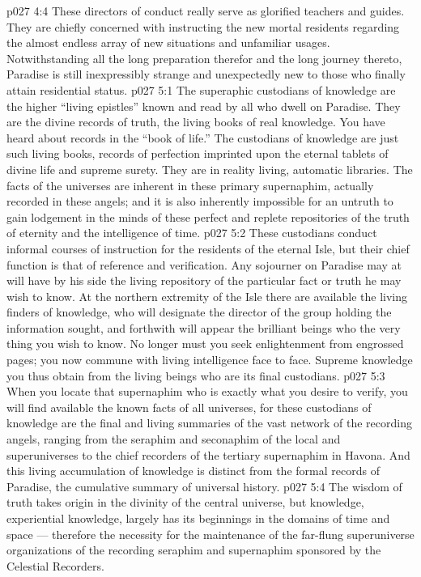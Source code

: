 \vs p027 4:4 These directors of conduct really serve as glorified teachers and guides. They are chiefly concerned with instructing the new mortal residents regarding the almost endless array of new situations and unfamiliar usages. Notwithstanding all the long preparation therefor and the long journey thereto, Paradise is still inexpressibly strange and unexpectedly new to those who finally attain residential status.
\vs p027 5:1 The superaphic custodians of knowledge are the higher “living epistles” known and read by all who dwell on Paradise. They are the divine records of truth, the living books of real knowledge. You have heard about records in the “book of life.” The custodians of knowledge are just such living books, records of perfection imprinted upon the eternal tablets of divine life and supreme surety. They are in reality living, automatic libraries. The facts of the universes are inherent in these primary supernaphim, actually recorded in these angels; and it is also inherently impossible for an untruth to gain lodgement in the minds of these perfect and replete repositories of the truth of eternity and the intelligence of time.
\vs p027 5:2 These custodians conduct informal courses of instruction for the residents of the eternal Isle, but their chief function is that of reference and verification. Any sojourner on Paradise may at will have by his side the living repository of the particular fact or truth he may wish to know. At the northern extremity of the Isle there are available the living finders of knowledge, who will designate the director of the group holding the information sought, and forthwith will appear the brilliant beings who  the very thing you wish to know. No longer must you seek enlightenment from engrossed pages; you now commune with living intelligence face to face. Supreme knowledge you thus obtain from the living beings who are its final custodians.
\vs p027 5:3 When you locate that supernaphim who is exactly what you desire to verify, you will find available  the known facts of all universes, for these custodians of knowledge are the final and living summaries of the vast network of the recording angels, ranging from the seraphim and seconaphim of the local and superuniverses to the chief recorders of the tertiary supernaphim in Havona. And this living accumulation of knowledge is distinct from the formal records of Paradise, the cumulative summary of universal history.
\vs p027 5:4 The wisdom of truth takes origin in the divinity of the central universe, but knowledge, experiential knowledge, largely has its beginnings in the domains of time and space --- therefore the necessity for the maintenance of the far\hyp{}flung superuniverse organizations of the recording seraphim and supernaphim sponsored by the Celestial Recorders.
